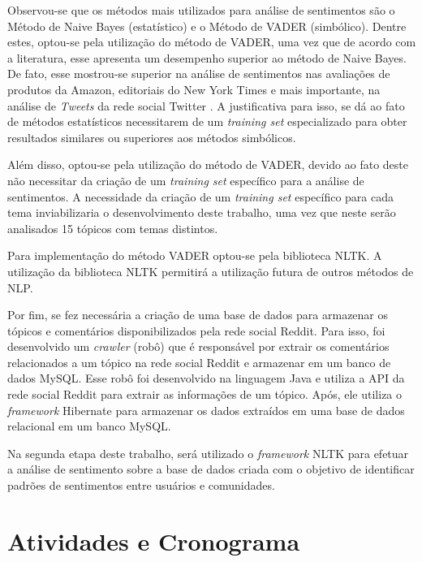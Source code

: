 Observou-se que os métodos mais utilizados para análise de sentimentos são o
Método de Naive Bayes (estatístico) e o Método de \ac{VADER} (simbólico). Dentre
estes, optou-se pela utilização do método de \ac{VADER}, uma vez que de acordo
com a literatura, esse apresenta um desempenho superior ao método de Naive
Bayes. De fato, esse mostrou-se superior na análise de sentimentos nas avaliações de
produtos da Amazon, editoriais do New York Times e mais importante, na análise
de \textit{Tweets} da rede social Twitter \cite{SentimentinSocialMedia}. A
justificativa para isso, se dá ao fato de métodos estatísticos necessitarem de um \textit{training set}
especializado para obter resultados similares ou superiores aos métodos
simbólicos. 

Além disso, optou-se pela utilização do método de \ac{VADER}, devido
ao fato deste não necessitar da criação de um \textit{training set} específico
para a análise de sentimentos. A necessidade da criação de um \textit{training
set} específico para cada tema inviabilizaria o desenvolvimento deste trabalho,
uma vez que neste serão analisados 15 tópicos com temas distintos.

Para implementação do método \ac{VADER} optou-se pela biblioteca \ac{NLTK}. A
utilização da biblioteca \ac{NLTK} permitirá a utilização futura de outros
métodos de \ac{NLP}.
 
Por fim, se fez necessária a criação de uma base de dados para armazenar os
tópicos e comentários disponibilizados pela rede social Reddit. Para isso, foi
desenvolvido um \textit{crawler} (robô) que é responsável por extrair os
comentários relacionados a um tópico na rede social Reddit e armazenar em um
banco de dados MySQL. Esse robô foi desenvolvido na linguagem Java e utiliza a
API da rede social Reddit para extrair as informações de um tópico. Após, ele
utiliza o \textit{framework} Hibernate para armazenar os dados extraídos em uma
base de dados relacional em um banco MySQL.

Na segunda etapa deste trabalho, será utilizado o \textit{framework} \ac{NLTK}
para efetuar a análise de sentimento sobre a base de dados criada com o objetivo
de identificar padrões de sentimentos entre usuários e comunidades.

\section{Atividades e Cronograma}

